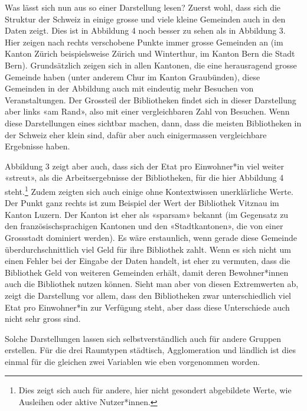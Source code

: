 \documentclass[a4paper,
fontsize=11pt,
oneside,
numbers=noperiodatend,
parskip=half-,
bibliography=totoc,
final
]{scrartcl}
\begin{document}
Was lässt sich nun aus so einer Darstellung lesen? Zuerst wohl, dass
sich die Struktur der Schweiz in einige grosse und viele kleine
Gemeinden auch in den Daten zeigt. Dies ist in Abbildung 4 noch besser
zu sehen als in Abbildung 3. Hier zeigen nach rechts verschobene Punkte
immer grosse Gemeinden an (im Kanton Zürich beispielsweise Zürich und
Winterthur, im Kanton Bern die Stadt Bern). Grundsätzlich zeigen sich in
allen Kantonen, die eine herausragend grosse Gemeinde haben (unter
anderem Chur im Kanton Graubünden), diese Gemeinden in der Abbildung
auch mit eindeutig mehr Besuchen von Veranstaltungen. Der Grossteil der
Bibliotheken findet sich in dieser Darstellung aber links «am Rand»,
also mit einer vergleichbaren Zahl von Besuchen. Wenn diese
Darstellungen eines sichtbar machen, dann, dass die meisten Bibliotheken
in der Schweiz eher klein sind, dafür aber auch einigermassen
vergleichbare Ergebnisse haben.

Abbildung 3 zeigt aber auch, dass sich der Etat pro Einwohner*in viel
weiter «streut», als die Arbeitsergebnisse der Bibliotheken, für die
hier Abbildung 4 steht.\footnote{Dies zeigt sich auch für andere, hier
  nicht gesondert abgebildete Werte, wie Ausleihen oder aktive
  Nutzer*innen.} Zudem zeigten sich auch einige ohne Kontextwissen
unerklärliche Werte. Der Punkt ganz rechts ist zum Beispiel der Wert der
Bibliothek Vitznau im Kanton Luzern. Der Kanton ist eher als «sparsam»
bekannt (im Gegensatz zu den französischsprachigen Kantonen und den
«Stadtkantonen», die von einer Grossstadt dominiert werden). Es wäre
erstaunlich, wenn gerade diese Gemeinde überdurchschnittlich viel Geld
für ihre Bibliothek zahlt. Wenn es sich nicht um einen Fehler bei der
Eingabe der Daten handelt, ist eher zu vermuten, dass die Bibliothek
Geld von weiteren Gemeinden erhält, damit deren Bewohner*innen auch die
Bibliothek nutzen können. Sieht man aber von diesen Extremwerten ab,
zeigt die Darstellung vor allem, dass den Bibliotheken zwar
unterschiedlich viel Etat pro Einwohner*in zur Verfügung steht, aber
dass diese Unterschiede auch nicht sehr gross sind.

Solche Darstellungen lassen sich selbstverständlich auch für andere
Gruppen erstellen. Für die drei Raumtypen städtisch, Agglomeration und
ländlich ist dies einmal für die gleichen zwei Variablen wie eben
vorgenommen worden.
\end{document}
